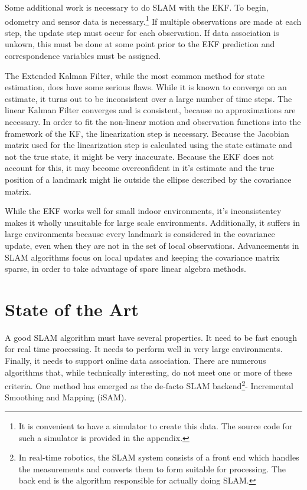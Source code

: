 \documentclass[12pt]{report}
\begin{document}
Some additional work is necessary to do SLAM with the EKF. To begin,
odometry and sensor data is necessary.\footnote{ It is convenient to
  have a simulator to create this data. The source code for such a
  simulator is provided in the appendix.} If multiple observations are
made at each step, the update step must occur for each observation.
If data association is unkown, this must be done at some point prior
to the EKF prediction and correspondence variables must be assigned.

The Extended Kalman Filter, while the most common method for state
estimation, does have some serious flaws.  While it is known to
converge on an estimate, \cite{HuangEKFAnalysis} it turns out to be
inconsistent over a large number of time steps.  The linear Kalman
Filter converges and is consistent, because no approximations are
necessary.  In order to fit the non-linear motion and observation
functions into the framework of the KF, the linearization step is
necessary.  Because the Jacobian matrix used for the linearization
step is calculated using the state estimate and not the true state,
it might be very inaccurate.  Because the EKF does not account for
this, it may become overconfident in it's estimate and the true
position of a landmark might lie outside the ellipse described by the
covariance matrix.

While the EKF works well for small indoor environments, it's
inconsistentcy makes it wholly unsuitable for large scale
environments.  Additionally, it suffers in large environments because
every landmark is considered in the covariance update, even when they
are not in the set of local observations.  Advancements in SLAM
algorithms focus on local updates and keeping the covariance matrix
sparse, in order to take advantage of spare linear algebra methods.


\chapter{State of the Art}

A good SLAM algorithm must have several properties. It need to be fast
enough for real time processing. It needs to perform well in very
large environments\cite{iSAM}. Finally, it needs to support online
data association. There are numerous algorithms that, while
technically interesting, do not meet one or more of these
criteria. One method has emerged as the de-facto SLAM
backend\footnote{In real-time robotics, the SLAM system consists of a
  front end which handles the measurements and converts them to form
  suitable for processing. The back end is the algorithm responsible
  for actually doing SLAM.}- Incremental Smoothing and Mapping
\cite{iSAM} (iSAM).
\end{document}
